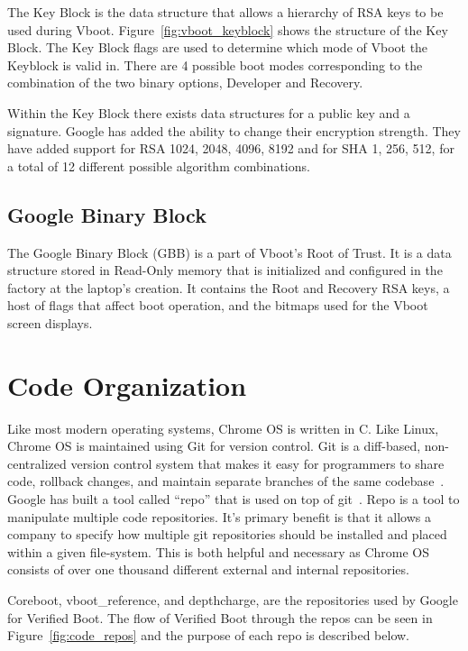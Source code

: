 The Key Block is the data structure that allows a hierarchy of RSA keys to be used during Vboot.
Figure~\ref{fig:vboot_keyblock} shows the structure of the Key Block. 
The Key Block flags are used to determine which mode of Vboot the Keyblock is valid in. 
There are 4 possible boot modes corresponding to the combination of the two binary options, Developer and Recovery.

Within the Key Block there exists data structures for a public key and a signature.
Google has added the ability to change their encryption strength.
They have added support for RSA 1024, 2048, 4096, 8192 and for SHA 1, 256, 512, for a total of 12 different possible algorithm combinations.

\subsection{Google Binary Block}

The Google Binary Block (GBB) is a part of Vboot's Root of Trust.
It is a data structure stored in Read-Only memory that is initialized and configured in the factory at the laptop's creation.
It contains the Root and Recovery RSA keys, a host of flags that affect boot
operation, and the bitmaps used for the Vboot screen displays.


\section{Code Organization}

Like most modern operating systems, Chrome OS is written in C.
Like Linux, Chrome OS is maintained using Git for version control. 
Git is a diff-based, non-centralized version control system that makes it easy for programmers to share code, rollback changes, and maintain separate branches of the same codebase~\cite{git}.
Google has built a tool called ``repo'' that is used on top of git~\cite{repo}. 
Repo is a tool to manipulate multiple code repositories. 
It's primary benefit is that it allows a company to specify how multiple git repositories should be installed and placed within a given file-system.
This is both helpful and necessary as Chrome OS consists of over one thousand different external and internal repositories. 

Coreboot, vboot\_reference, and depthcharge, are the repositories used by Google
for Verified Boot.
The flow of Verified Boot through the repos can be seen in
Figure~\ref{fig:code_repos} and the purpose of each repo is described below.

